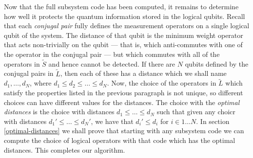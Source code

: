 \documentclass[twocolumn,showpacs,preprintnumbers,amsmath,amssymb,nofootinbib,pra,floatfix]{revtex4}
\newcommand{\set}{\tilde}
\begin{document}
\label{optimal-distances}

Now that the full subsystem code has been computed, it remains to determine how well it protects the quantum information stored in the logical qubits.  Recall that each \emph{conjugal pair} fully defines the measurement operators on a single logical qubit of the system.  The distance of that qubit is the minimum weight operator that acts non-trivially on the qubit --- that is, which anti-commutes with one of the operator in the conjugal pair --- but which commutes with all of the operators in $\set S$ and hence cannot be detected.  If there are $N$ qubits defined by the conjugal pairs in $\set L$, then each of these has a distance which we shall name $d_1,\dots,d_N$, where $d_1\le d_2 \le \dots \le d_N$.  Now, the choice of the operators in $\set L$ which satisfy the properties listed in the previous paragraph is not unique, so different choices can have different values for the distances.  The choice with the \emph{optimal distances} is the choice with distances $d_1\le \dots \le d_N$ such that given any choicr with distances $d_1'\le \dots \le d_N'$, we have that $d_i' \le d_i$ for $i\in 1\dots N$.  In section \ref{optimal-distances} we shall prove that starting with any subsystem code we can compute the choice of logical operators with that code which has the optimal distances.  This completes our algorithm.
\end{document}
